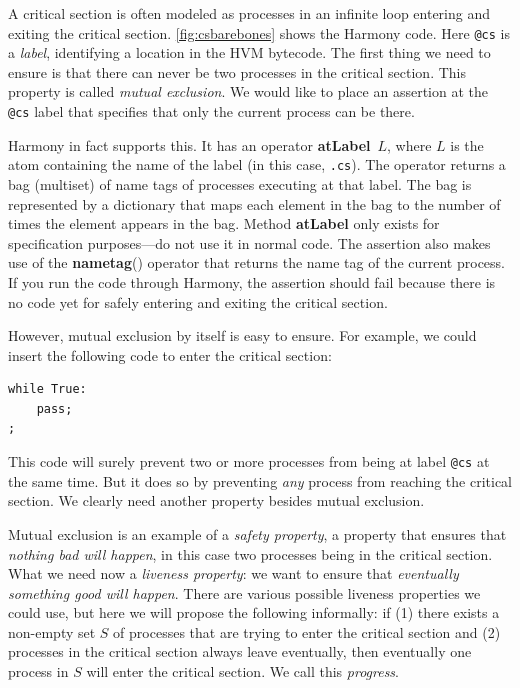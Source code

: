 \documentclass{report}
\newenvironment{code}{
\tcolorbox
}{
\endtcolorbox
}
\begin{document}
%

A critical section is often modeled as processes in an infinite loop
entering and exiting the critical section.
\autoref{fig:csbarebones} shows the Harmony code.
Here \texttt{@cs} is a \emph{label},
%
identifying a location in the HVM bytecode.  The first thing we need to
ensure is that there can never be two processes in the critical section.
This property is called \emph{mutual exclusion}.
%
We would like to place an assertion at the \texttt{@cs} label that
specifies that only the current process can be there.

Harmony in fact supports this.
It has an operator \textbf{atLabel}~$L$,
%
where $L$
is the atom containing the name of the label (in this case, \texttt{.cs}).
The operator returns a bag (multiset) of name tags of processes executing at that
label.  The bag is represented by a dictionary that maps each element
in the bag to the number of times the element appears in the bag.
Method \textbf{atLabel} only exists for specification purposes---do not
use it in normal code.
The assertion also makes use of the \textbf{nametag}() operator
%
that returns the name tag of the current process.
If you run the code through Harmony, the assertion should fail because
there is no code yet for safely entering and exiting the critical section.

However, mutual exclusion by itself is easy to ensure.
For example, we could insert the following code to enter the
critical section:
\begin{code}
\begin{verbatim}
while True:
    pass;
;
\end{verbatim}
\end{code}
This code will surely prevent two or more processes from being
at label \texttt{@cs} at the same time.
But it does so by preventing \emph{any} process from reaching
the critical section.
We clearly need another property besides mutual exclusion.

Mutual exclusion is an example of a \emph{safety property},
%
a property that ensures that \emph{nothing bad will happen}, in this case
two processes being in the critical section.
What we need now a \emph{liveness property}:
%
we want to ensure that
\emph{eventually something good will happen}.
There are various possible liveness properties we could use,
but here we will propose the following informally: if
(1) there exists a non-empty
set $S$ of processes that are trying to enter the critical section and
(2) processes in the critical section always leave eventually, then
eventually one process in $S$ will enter the critical section.
We call this \emph{progress}.
%
\end{document}
